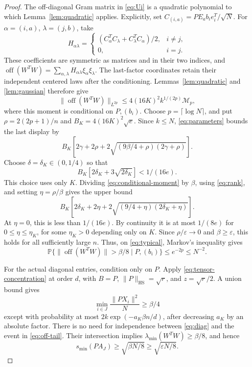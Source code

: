 \documentclass[11pt]{article}
\newcommand{\Prob}{\mathbb P}
\newcommand{\HS}{\mathrm{HS}}
\newcommand{\off}{\operatorname{off}}
\begin{document}
\begin{proof}
The off-diagonal Gram matrix in \eqref{eq:Ui} is a quadratic
polynomial to which Lemma~\ref{lem:quadratic} applies.
Explicitly, set \(C_{(i,a)}=PE_ab_i e_i^T/\sqrt N\).
For \(\alpha=(i,a)\), \(\lambda=(j,b)\), take
\[
 H_{\alpha\lambda}=
 \begin{cases}
 (C_\alpha^TC_\lambda+C_\lambda^TC_\alpha)/2,&i\ne j,\\
 0,&i=j.
 \end{cases}
\]
These coefficients are symmetric as matrices and in their two
indices, and
\(\off(W^TW)=\sum_{\alpha,\lambda}
H_{\alpha\lambda}\xi_\alpha\xi_\lambda\).
The last-factor coordinates retain their independent centered
laws after the conditioning. Lemmas~\ref{lem:quadratic}
and \ref{lem:gaussian} therefore give
\[
 \|\off(W^TW)\|_{L^{2p}}
 \le4(16K)^2k^{1/(2p)}\mathcal M_p,
\]
where this moment is conditional on \(P,(b_i)\).
Choose \(p=\lceil\log N\rceil\), and put
\(\rho=2(2p+1)/n\) and \(B_K=4(16K)^2\sqrt e\).
Since \(k\le N\), \eqref{eq:parameters} bounds the last display by
\begin{equation}\label{eq:conditional-moment}
 B_K\left[2\gamma+2\rho+
 2\sqrt{(9\beta/4+\rho)(2\gamma+\rho)}\right].
\end{equation}
Choose \(\delta=\delta_K\in(0,1/4)\) so that
\begin{equation}\label{eq:delta}
 B_K[2\delta_K+3\sqrt{2\delta_K}]<1/(16e).
\end{equation}
This choice uses only \(K\).
Dividing \eqref{eq:conditional-moment} by \(\beta\),
using \eqref{eq:rank}, and setting \(\eta=\rho/\beta\)
gives the upper bound
\[
 B_K\left[2\delta_K+2\eta+
 2\sqrt{(9/4+\eta)(2\delta_K+\eta)}\right].
\]
At \(\eta=0\), this is less than \(1/(16e)\).
By continuity it is at most \(1/(8e)\) for
\(0\le\eta\le\eta_K\), for some \(\eta_K>0\) depending only on \(K\).
Since \(\rho/\varepsilon\to0\) and \(\beta\ge\varepsilon\),
this holds for all sufficiently large \(n\). Thus, on
\eqref{eq:typical}, Markov's inequality gives
\begin{equation}\label{eq:off-tail}
 \Prob\{\|\off(W^TW)\|>\beta/8\mid P,(b_i)\}
 \le e^{-2p}\le N^{-2}.
\end{equation}

For the actual diagonal entries, condition only on \(P\).
Apply \eqref{eq:tensor-concentration} at order \(d\), with
\(B=P\), \(\|P\|_{\HS}=\sqrt r\), and \(z=\sqrt r/2\).
A union bound gives
\begin{equation}\label{eq:diag}
 \min_{i\in J}\frac{\|PX_i\|^2}{N}\ge\beta/4
\end{equation}
except with probability at most \(2k\exp(-a_K\beta n/d)\),
after decreasing \(a_K\) by an absolute factor.
There is no need for independence between \eqref{eq:diag}
and the event in \eqref{eq:off-tail}.
Their intersection implies
\(\lambda_{\min}(W^TW)\ge\beta/8\), and hence
\[
 s_{\min}(PA_J)\ge\sqrt{\beta N/8}
                  \ge\sqrt{\varepsilon N/8}.
\]


\end{proof}
\end{document}
